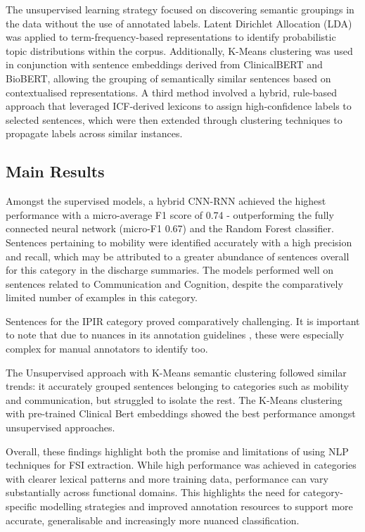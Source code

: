 The unsupervised learning strategy focused on discovering semantic groupings in the data without the use of annotated labels. Latent Dirichlet Allocation (LDA) was applied to term-frequency-based representations to identify probabilistic topic distributions within the corpus. Additionally, K-Means clustering was used in conjunction with sentence embeddings derived from ClinicalBERT and BioBERT, allowing the grouping of semantically similar sentences based on contextualised representations. A third method involved a hybrid, rule-based approach that leveraged ICF-derived lexicons to assign high-confidence labels to selected sentences, which were then extended through clustering techniques to propagate labels across similar instances. \medskip

\subsection{Main Results}
Amongst the supervised models, a hybrid CNN-RNN achieved the highest performance with a micro-average F1 score of 0.74 - outperforming the fully connected neural network (micro-F1 0.67) and the Random Forest classifier. Sentences pertaining to mobility were identified accurately with a high precision and recall, which may be attributed to a greater abundance of sentences overall for this category in the discharge summaries. The models performed well on sentences related to Communication and Cognition, despite the comparatively limited number of examples in this category.\medskip

Sentences for the IPIR category proved comparatively challenging. It is important to note that due to nuances in its annotation guidelines \cite{InterpersonalGuideline2023}, these were especially complex for manual annotators to identify too. \medskip

The Unsupervised approach with K-Means semantic clustering followed similar trends: it accurately grouped sentences belonging to categories such as mobility and communication, but struggled to isolate the rest. The K-Means clustering with pre-trained Clinical Bert embeddings showed the best performance amongst unsupervised approaches.\medskip

Overall, these findings highlight both the promise and limitations of using NLP techniques for FSI extraction. While high performance was achieved in categories with clearer lexical patterns and more training data, performance can vary substantially across functional domains. This highlights the need for category-specific modelling strategies and improved annotation resources to support more accurate, generalisable and increasingly more nuanced classification.

